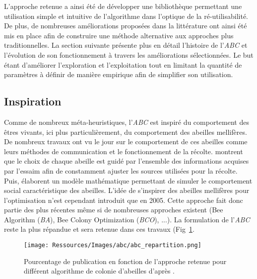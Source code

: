 L’approche retenue a ainsi été de développer une bibliothèque permettant une utilisation
simple et intuitive de l’algorithme dans l’optique de la ré-utilisabilité. De plus,
de nombreuses améliorations proposées dans la littérature ont ainsi été mis en place
afin de construire une méthode alternative aux approches plus traditionnelles.
La section suivante présente plus en détail l’histoire de l’\textit{ABC} et l’évolution de
son fonctionnement à travers les améliorations sélectionnées.
Le but étant d’améliorer l’exploration et l’exploitation tout en limitant la quantité
de paramètres à définir de manière empirique afin de simplifier son utilisation.



\subsection{Inspiration} %
\label{sub:inspiration}
Comme de nombreux méta-heuristiques, l’\textit{ABC} est inspiré du comportement des êtres
vivants, ici plus particulièrement, du comportement des abeilles mellifères. De
nombreux travaux ont vu le jour sur le comportement de ces abeilles comme leurs méthodes
de communication et le fonctionnement de la récolte. \cite{Visscher19821790} montrent
que le choix de chaque abeille est guidé par l’ensemble des informations acquises
par l’essaim afin de constamment ajuster les sources utilisées pour la récolte.
Puis, \cite{Camazine1991547} élaborent un modèle mathématique permettant de simuler
le comportement social caractéristique des abeilles.
L’idée de s’inspirer des abeilles mellifères pour l’optimisation n’est cependant
introduit que en 2005. Cette approche fait donc partie des plus récentes
\parencite{Karaboga2005} même si de nombreuses approches existent
(Bee Algorithm (\textit{BA}), Bee Colony Optimization (\textit{BCO}), ...).
La formulation de l’\textit{ABC} reste la plus répandue et sera retenue dans ces travaux
(Fig~\ref{fig:abc_repartition}.

\begin{figure}
    \begin{center}
        \texttt{[image: Ressources/Images/abc/abc\_repartition.png]}
    \end{center}
    \caption{Pourcentage de publication en fonction de l’approche retenue pour différent
             algorithme de colonie d’abeilles d’après \cite{Karaboga201221}.
             \label{fig:abc_repartition}}
\end{figure}


